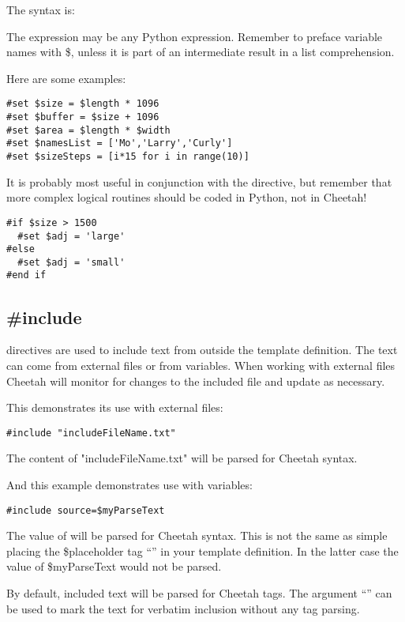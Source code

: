 The syntax is: 

The expression may be any Python expression. Remember to preface variable names
with \$, unless it is part of an intermediate result in a list comprehension.

Here are some examples:
\begin{verbatim}
#set $size = $length * 1096
#set $buffer = $size + 1096
#set $area = $length * $width
#set $namesList = ['Mo','Larry','Curly']
#set $sizeSteps = [i*15 for i in range(10)]
\end{verbatim}

It is probably most useful in conjunction with the  directive, but
remember that more complex logical routines should be coded in Python, not in
Cheetah!
\begin{verbatim}
#if $size > 1500
  #set $adj = 'large'
#else
  #set $adj = 'small'
#end if
\end{verbatim}


\subsection{\#include}
\label{directives.include}

 directives are used to include text from outside the template
definition.  The text can come from external files or from 
variables.  When working with external files Cheetah will monitor for changes to
the included file and update as necessary.  

This demonstrates its use with external files:
\begin{verbatim}
#include "includeFileName.txt"
\end{verbatim}
The content of "includeFileName.txt" will be parsed for Cheetah syntax.

And this example demonstrates use with  variables:
\begin{verbatim}
#include source=$myParseText
\end{verbatim}
The value of  will be parsed for Cheetah syntax. This is not
the same as simple placing the \$placeholder tag ``'' in
your template definition.  In the latter case the value of \$myParseText would
not be parsed.

By default, included text will be parsed for Cheetah tags.  The argument
``'' can be used to mark the text for verbatim inclusion without any tag
parsing.

